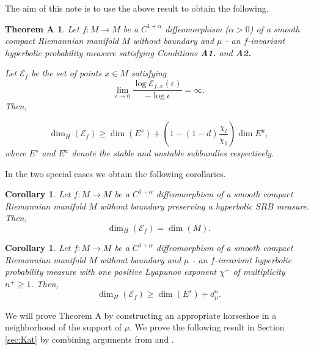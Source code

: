\documentclass{amsart}
\theoremstyle{plain}
\newtheorem*{thmA}{Theorem A}
\newtheorem{cor}[thm]{Corollary}
\theoremstyle{definition}
\theoremstyle{remark}
\numberwithin{equation}{section}
\begin{document}
The aim of this note is to use the above result to obtain the following.



\begin{thmA}\label{thm:main}
Let $f: M \to M$ be a $C^{1+\alpha}$ diffeomorphism ($\alpha>0$) of a smooth compact Riemannian manifold $M$ without boundary and $\mu$ - an $f$-invariant hyperbolic probability measure
satisfying Conditions \textbf{A1.} and \textbf{A2.}


 Let $\mathcal{E}_{f}$ be the set of points $x\in M$ satisfying
 \begin{equation*}
 \lim _{\epsilon \to 0}  \frac{\log \mathscr E_{f,x}(\epsilon ) }{-\log \epsilon } =\infty.
\end{equation*}
Then, 


$$  \dim_H(\mathcal{E}_f) \geq  \dim(E^s) +  \left( 1   - (1-d)\frac{\chi_l}{\chi_1}   \right)\dim E^u ,   $$
where $E^s$ and $E^u$ denote the stable and unstable subbundles respectively.
\end{thmA}

In the two special cases we obtain the following corollaries.


\begin{cor}
Let $f: M \to M$ be a $C^{1+\alpha}$ diffeomorphism of a smooth compact Riemannian manifold $M$ without boundary 
preserving a hyperbolic $SRB$ measure. Then,
$$  \dim_H(\mathcal{E}_f) = \dim(M) .   $$
\end{cor}

\begin{cor}
Let $f: M \to M$ be a $C^{1+\alpha}$ diffeomorphism of a smooth compact Riemannian manifold $M$ without boundary and $\mu$ - an $f$-invariant hyperbolic probability measure
with one positive Lyapunov exponent $\chi^+$ of multiplicity $n^+\geq 1$.
Then, 
$$  \dim_H(\mathcal{E}_f) \geq  \dim(E^s) +  d_{\mu}^u  .   $$
\end{cor}


We will prove Theorem A by constructing an appropriate horseshoe in a neighborhood of the support of $\mu$. 
We prove the following result in Section \ref{sec:Kat} by combining arguments from \cite{ACW} and \cite{Mendoza}.
\end{document}
